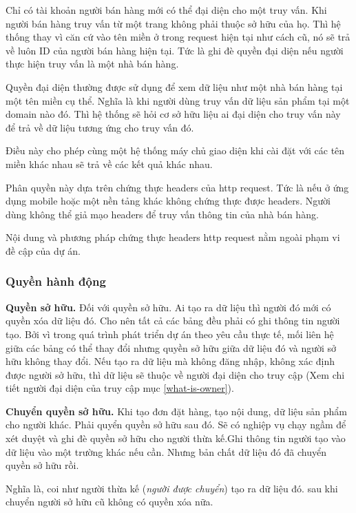 \documentclass[11pt]{report}
\begin{document}
	Chỉ có tài khoản người bán hàng mới có thể đại diện cho một truy vấn. Khi người bán hàng truy vấn từ một trang không phải thuộc sở hữu của họ. Thì hệ thống thay vì căn cứ vào tên miền ở trong request hiện tại như cách cũ, nó sẽ trả về luôn ID của người bán hàng hiện tại. Tức là ghi đè quyền đại diện nếu người thực hiện truy vấn là một nhà bán hàng.
	
	Quyền đại diện thường được sử dụng để xem dữ liệu như một nhà bán hàng tại một tên miền cụ thể. Nghĩa là khi người dùng truy vấn dữ liệu sản phẩm tại một domain nào đó. Thì hệ thống sẽ hỏi cơ sở hữu liệu ai đại diện cho truy vấn này để trả về dữ liệu tương ứng cho truy vấn đó.
	
	Điều này cho phép cùng một hệ thống máy chủ giao diện khi cài đặt với các tên miền khác nhau sẽ trả về các kết quả khác nhau.
	
	Phân quyền này dựa trên chứng thực headers của \acrshort{http} request. Tức là nếu ở ứng dụng mobile hoặc một nền tảng khác không chứng thực được headers. Người dùng không thể giả mạo headers để truy vấn thông tin của nhà bán hàng.
	
	Nội dung và phương pháp chứng thực headers \acrshort{http} request nằm ngoài phạm vi đề cập của dự án.
	
	\subsubsection{Quyền hành động}
	
	\textbf{Quyền sở hữu.} Đối với quyền sở hữu. Ai tạo ra dữ liệu thì người đó mới có quyền xóa dữ liệu đó. Cho nên tất cả các bảng đều phải có ghi thông tin người tạo. Bởi vì trong quá trình phát triển dự án theo yêu cầu thực tế, mối liên hệ giữa các bảng có thể thay đổi nhưng quyền sở hữu giữa dữ liệu đó và người sở hữu không thay đổi. Nếu tạo ra dữ liệu mà không đăng nhập, không xác định được người sở hữu, thì dữ liệu sẽ thuộc về người đại diện cho truy cập (Xem chi tiết người đại diện của truy cập mục \ref{what-is-owner}).
	
	\textbf{Chuyển quyền sở hữu.} Khi tạo đơn đặt hàng, tạo nội dung, dữ liệu sản phẩm cho người khác. Phải quyển quyền sở hữu sau đó. Sẽ có nghiệp vụ chạy ngầm để xét duyệt và ghi đè quyền sở hữu cho người thừa kế.Ghi thông tin người tạo vào dữ liệu vào một trường khác nếu cần. Nhưng bản chất dữ liệu đó đã chuyển quyền sở hữu rồi.
	
	Nghĩa là, coi như người thừa kế  (\emph{người được chuyển}) tạo ra dữ liệu đó. sau khi chuyển người sở hữu cũ không có quyền xóa nữa.
	
\end{document}
